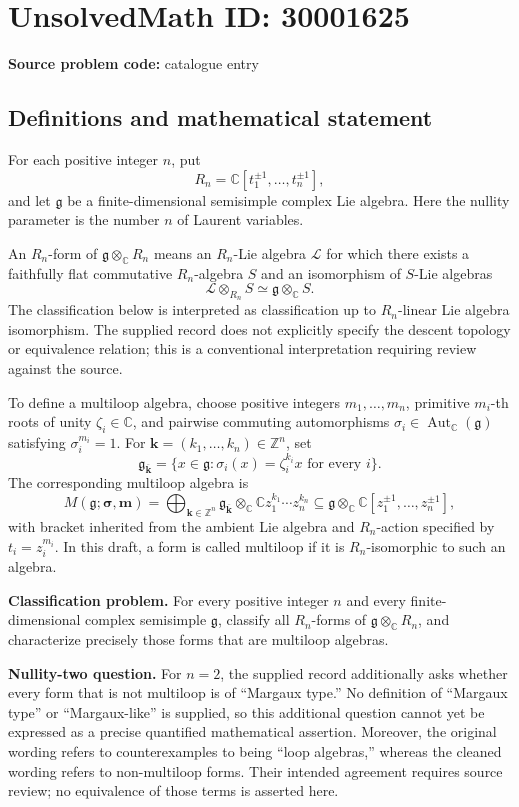 \documentclass[11pt]{article}
\newcommand{\Z}{\mathbb{Z}}
\newcommand{\C}{\mathbb{C}}
\begin{document}
\section*{UnsolvedMath ID: 30001625}
\textbf{Source problem code:} catalogue entry
\subsection{Definitions and mathematical statement}
For each positive integer \(n\), put
\[
R_n=\C[t_1^{\pm1},\ldots,t_n^{\pm1}],
\]
and let \(\mathfrak g\) be a finite-dimensional semisimple complex Lie algebra. Here the nullity parameter is the number \(n\) of Laurent variables.

An \(R_n\)-form of \(\mathfrak g\otimes_{\C}R_n\) means an \(R_n\)-Lie algebra \(\mathcal L\) for which there exists a faithfully flat commutative \(R_n\)-algebra \(S\) and an isomorphism of \(S\)-Lie algebras
\[
\mathcal L\otimes_{R_n}S\simeq\mathfrak g\otimes_{\C}S.
\]
The classification below is interpreted as classification up to \(R_n\)-linear Lie algebra isomorphism. The supplied record does not explicitly specify the descent topology or equivalence relation; this is a conventional interpretation requiring review against the source.

To define a multiloop algebra, choose positive integers \(m_1,\ldots,m_n\), primitive \(m_i\)-th roots of unity \(\zeta_i\in\C\), and pairwise commuting automorphisms \(\sigma_i\in\operatorname{Aut}_{\C}(\mathfrak g)\) satisfying \(\sigma_i^{m_i}=1\). For \(\mathbf k=(k_1,\ldots,k_n)\in\Z^n\), set
\[
\mathfrak g_{\overline{\mathbf k}}
=\{x\in\mathfrak g: \sigma_i(x)=\zeta_i^{k_i}x\text{ for every }i\}.
\]
The corresponding multiloop algebra is
\[
M(\mathfrak g;\boldsymbol\sigma,\mathbf m)
=\bigoplus_{\mathbf k\in\Z^n}
\mathfrak g_{\overline{\mathbf k}}\otimes_{\C}
\C z_1^{k_1}\cdots z_n^{k_n}
\subseteq\mathfrak g\otimes_{\C}\C[z_1^{\pm1},\ldots,z_n^{\pm1}],
\]
with bracket inherited from the ambient Lie algebra and \(R_n\)-action specified by \(t_i=z_i^{m_i}\). In this draft, a form is called multiloop if it is \(R_n\)-isomorphic to such an algebra.

\textbf{Classification problem.} For every positive integer \(n\) and every finite-dimensional complex semisimple \(\mathfrak g\), classify all \(R_n\)-forms of \(\mathfrak g\otimes_{\C}R_n\), and characterize precisely those forms that are multiloop algebras.

\textbf{Nullity-two question.} For \(n=2\), the supplied record additionally asks whether every form that is not multiloop is of ``Margaux type.'' No definition of ``Margaux type'' or ``Margaux-like'' is supplied, so this additional question cannot yet be expressed as a precise quantified mathematical assertion. Moreover, the original wording refers to counterexamples to being ``loop algebras,'' whereas the cleaned wording refers to non-multiloop forms. Their intended agreement requires source review; no equivalence of those terms is asserted here.
\end{document}
